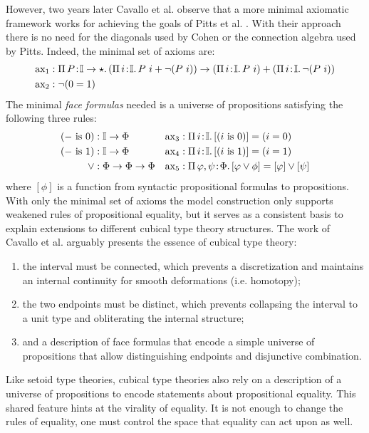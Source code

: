 However, two years later Cavallo et al. observe that a more minimal axiomatic framework works for achieving the goals of Pitts et al. \cite{cavallo2020}.
With their approach there is no need for the diagonals used by Cohen or the connection algebra used by Pitts.
Indeed, the minimal set of axioms are:
\begin{align*}
    \text{ax}_1 &: \abs{\Pi}{P}{\mathbb{I} \to \star}{
        (\abs{\Pi}{i}{\mathbb{I}}{P\ i + \neg(P\ i)}) \to
        (\abs{\Pi}{i}{\mathbb{I}}{P\ i})
        + (\abs{\Pi}{i}{\mathbb{I}}{\neg(P\ i)})
    } \\
    \text{ax}_2 &: \neg(0 = 1)
\end{align*}
The minimal \textit{face formulas} needed is a universe of propositions satisfying the following three rules:
\begin{align*}
    (-\text{ is }0) &: \mathbb{I} \to \Phi
    &\text{ax}_3 &: {\Pi}\, i\! : \! \mathbb{I}.\, 
        [(i\text{ is 0})] = (i = 0)
    \\
    (-\text{ is }1) &: \mathbb{I} \to \Phi
    &\text{ax}_4 &: {\Pi}\, i\! : \! \mathbb{I}.\, [(i\text{ is 1})] = (i = 1) \\
    \vee &: \Phi \to \Phi \to \Phi
    &\text{ax}_5 &: {\Pi}\, \varphi, \psi\! : \! \Phi.\, [\varphi \vee \phi] = [\varphi] \vee [\psi]
\end{align*}
where $[\phi]$ is a function from syntactic propositional formulas to propositions.
With only the minimal set of axioms the model construction only supports weakened rules of propositional equality, but it serves as a consistent basis to explain extensions to different cubical type theory structures.
The work of Cavallo et al. arguably presents the essence of cubical type theory:
\begin{enumerate}
    \item {
        the interval must be connected, which prevents a discretization and maintains an internal continuity for smooth deformations (i.e. homotopy);
    }
    \item {
        the two endpoints must be distinct, which prevents collapsing the interval to a unit type and obliterating the internal structure;
    }
    \item {
        and a description of face formulas that encode a simple universe of propositions that allow distinguishing endpoints and disjunctive combination.
    }
\end{enumerate}
Like setoid type theories, cubical type theories also rely on a description of a universe of propositions to encode statements about propositional equality.
This shared feature hints at the virality of equality.
It is not enough to change the rules of equality, one must control the space that equality can act upon as well.

